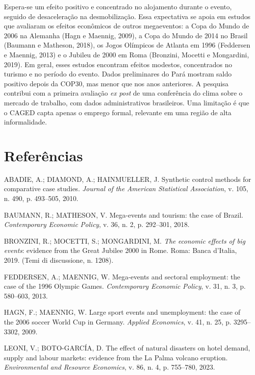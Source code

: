 \documentclass[12pt,a4paper]{article}
\begin{document}
Espera-se um efeito positivo e concentrado no alojamento durante o evento, seguido de desaceleração
na desmobilização. Essa expectativa se apoia em estudos que avaliaram os efeitos econômicos de
outros megaeventos: a Copa do Mundo de 2006 na Alemanha (Hagn e Maennig, 2009), a Copa do Mundo de
2014 no Brasil (Baumann e Matheson, 2018), os Jogos Olímpicos de Atlanta em 1996 (Feddersen e
Maennig, 2013) e o Jubileu de 2000 em Roma (Bronzini, Mocetti e Mongardini, 2019). Em geral, esses
estudos encontram efeitos modestos, concentrados no turismo e no período do evento. Dados preliminares
do Pará mostram saldo positivo depois da COP30, mas menor que nos anos anteriores. A pesquisa contribui com a primeira avaliação \textit{ex post} de uma conferência do clima sobre o
mercado de trabalho, com dados administrativos brasileiros. Uma limitação é que o CAGED capta apenas o emprego formal,
relevante em uma região de alta informalidade.

\section{Referências}
\small
ABADIE, A.; DIAMOND, A.; HAINMUELLER, J. Synthetic control methods for comparative case studies.
\textit{Journal of the American Statistical Association}, v. 105, n. 490, p. 493--505, 2010.\par
BAUMANN, R.; MATHESON, V. Mega-events and tourism: the case of Brazil. \textit{Contemporary Economic
Policy}, v. 36, n. 2, p. 292--301, 2018.\par
BRONZINI, R.; MOCETTI, S.; MONGARDINI, M. \textit{The economic effects of big events}: evidence from the
Great Jubilee 2000 in Rome. Roma: Banca d'Italia, 2019. (Temi di discussione, n. 1208).\par
FEDDERSEN, A.; MAENNIG, W. Mega-events and sectoral employment: the case of the 1996 Olympic Games.
\textit{Contemporary Economic Policy}, v. 31, n. 3, p. 580--603, 2013.\par
HAGN, F.; MAENNIG, W. Large sport events and unemployment: the case of the 2006 soccer World Cup in
Germany. \textit{Applied Economics}, v. 41, n. 25, p. 3295--3302, 2009.\par
LEONI, V.; BOTO-GARCÍA, D. The effect of natural disasters on hotel demand, supply and labour markets:
evidence from the La Palma volcano eruption. \textit{Environmental and Resource Economics}, v. 86,
n. 4, p. 755--780, 2023.\par
\end{document}
